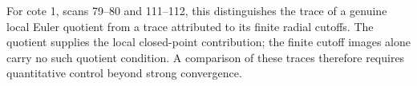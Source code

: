 For cote 1, scans 79--80 and 111--112, this distinguishes
the trace of a genuine local Euler quotient from a
trace attributed to its finite radial cutoffs.  The
quotient supplies the local closed-point contribution;
the finite cutoff images alone carry no such quotient
condition.  A comparison of these traces therefore
requires quantitative control beyond strong convergence.
